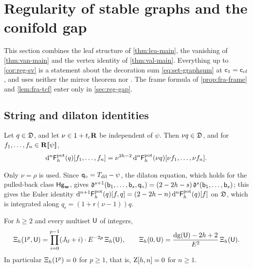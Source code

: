 \section{Regularity of stable graphs and the conifold gap}
\label{sec:reg}

This section combines the leaf structure of \cref{thm:lea-main}, the vanishing of \cref{thm:van-main} and the vertex identity of \cref{thm:val-main}. Everything up to \cref{cor:reg-sv} is a statement about the decoration sum \eqref{eq:set-graphsum} at $\mathsf{c}_{1}=\mathsf{c}_{\mathrm{cf}}$, and uses neither the mirror theorem nor \cite[Theorem~(2)]{Tel12}. The frame formula of \cref{prop:fra-frame} and \cref{lem:fra-tcf} enter only in \cref{sec:reg-gap}.

\subsection{String and dilaton identities}
\label{sec:reg-string}

\begin{lem}
\label{lem:reg-H0}
Let $q\in\mathfrak{D}$, and let $\nu\in 1+t_{\mathrm{c}}\mathbf{R}$ be independent of $\psi$. Then $\nu q\in\mathfrak{D}$, and for $f_1,\dots,f_n\in\mathbf{R}[\![ \psi ]\!]$,
\begin{equation}
\label{eq:reg-H0}
\mathrm{d}^n\mathsf{F}^{\mathrm{pot}}_h(q)[f_1,\dots,f_n]=\nu^{2h-2}\,\mathrm{d}^n\mathsf{F}^{\mathrm{pot}}_h(\nu q)[\nu f_1,\dots,\nu f_n].
\end{equation}
\end{lem}

Only $\nu=\rho$ is used. Since $\mathsf{q}_{\circ}=T_{\mathrm{dil}}-\psi$, the dilaton equation, which holds for the pulled-back class $\mathsf{Hg}_{\mathbf{w}}$, gives $\mathfrak{d}^{s+1}(\mathsf{b}_1,\dots,\mathsf{b}_s,\mathsf{q}_{\circ})=(2-2h-s)\,\mathfrak{d}^s(\mathsf{b}_1,\dots,\mathsf{b}_s)$; this gives the Euler identity $\mathrm{d}^{n+1}\mathsf{F}^{\mathrm{pot}}_h(q)[f,q]=(2-2h-n)\,\mathrm{d}^n\mathsf{F}^{\mathrm{pot}}_h(q)[f]$ on $\mathfrak{D}$, which is integrated along $q_{\mathsf{r}}=(1+\mathsf{r}(\nu-1))q$.

\begin{lem}
\label{lem:reg-string}
For $h\geq 2$ and every multiset $\mathsf{U}$ of integers,
\[
\Xi_h(1^p,\mathsf{U})=\prod_{i=0}^{p-1}(J_{\mathsf{U}}+i)\cdot E^{-2p}\,\Xi_h(\mathsf{U}),\qquad
\Xi_h(0,\mathsf{U})=\frac{\mathrm{dg}(\mathsf{U})-2h+2}{E^2}\,\Xi_h(\mathsf{U}).
\]
In particular $\Xi_h(1^p)=0$ for $p\geq1$, that is, $\mathrm{Z}[h,n]=0$ for $n\geq 1$.
\end{lem}


